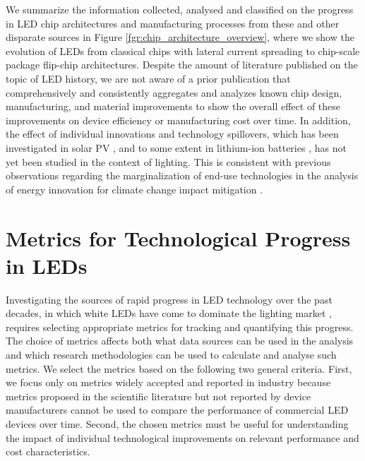 \documentclass[journal=jacsat,manuscript=article]{achemso}
\begin{document}
We summarize the information collected, analysed and classified on the progress in LED chip architectures and manufacturing processes from these and other disparate sources in Figure \ref{fgr:chip_architecture_overview}, where we show the evolution of LEDs from classical chips with lateral current spreading to chip-scale package flip-chip architectures. Despite the amount of literature published on the topic of LED history, we are not aware of a prior publication that comprehensively and consistently aggregates and analyzes known chip design, manufacturing, and material improvements to show the overall effect of these improvements on device efficiency or manufacturing cost over time. In addition, the effect of individual innovations and technology spillovers, which has been investigated in solar PV \cite{kavlak2018evaluating,kolesnikov2020novel,nemet2019solar}, and to some extent in lithium-ion batteries \cite{Stephan2021}, has not yet been studied in the context of lighting. This is consistent with previous observations regarding the marginalization of end-use technologies in the analysis of energy innovation for climate change impact mitigation \cite{Wilson2012,Creutzig2018}.

\section{Metrics for Technological Progress in LEDs}

Investigating the sources of rapid progress in LED technology over the past decades, in which white LEDs have come to dominate the lighting market \cite{zissis2021}, requires selecting appropriate metrics for tracking and quantifying this progress. The choice of metrics affects both what data sources can be used in the analysis and which research methodologies can be used to calculate and analyse such metrics. We select the metrics based on the following two general criteria. First, we focus only on metrics widely accepted and reported in industry because metrics proposed in the scientific literature but not reported by device manufacturers cannot be used to compare the performance of commercial LED devices over time. Second, the chosen metrics must be useful for understanding the impact of individual technological improvements on relevant performance and cost characteristics.
\end{document}

